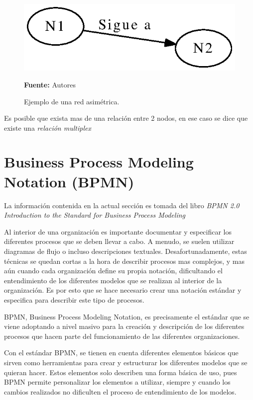 \begin{figure}[!htb]
  \begin{center}
    \includegraphics{./imagenes/Red_asimetrica.eps}
    \caption{Ejemplo de una red asimétrica.}
    \label{fig:asimetrica}
    \textbf{Fuente:}  Autores
  \end{center}
\end{figure}

Es posible que exista mas de una relación entre 2 nodos, en ese caso se dice que existe una \textit{relación multiplex} \cite[Cap.2]{cap_sna}


\section{Business Process Modeling Notation (BPMN)}

La información contenida en la actual sección es tomada del libro \textit{BPMN 2.0 Introduction to the Standard for Business Process Modeling} \cite{bpmn2}

Al interior de una organización es importante documentar y especificar los diferentes procesos que se deben llevar a cabo. A menudo, se suelen utilizar diagramas de flujo o incluso descripciones textuales. Desafortunadamente, estas técnicas se quedan cortas a la hora de describir procesos mas complejos, y mas aún cuando cada organización define su propia notación, dificultando el entendimiento de los diferentes modelos que se realizan al interior de la organización. Es por esto que se hace necesario crear una notación estándar y especifica para describir este tipo de procesos.

BPMN, Business Process Modeling Notation, es precisamente el estándar que se viene adoptando a nivel masivo para la creación y descripción de los diferentes procesos que hacen parte del funcionamiento de las diferentes organizaciones.


Con el estándar BPMN, se tienen en cuenta diferentes elementos básicos que sirven como herramientas para crear y estructurar los diferentes modelos que se quieran hacer. Estos elementos solo describen una forma básica de uso, pues BPMN permite personalizar los elementos a utilizar, siempre y cuando los cambios realizados no dificulten el proceso de entendimiento de los modelos.

